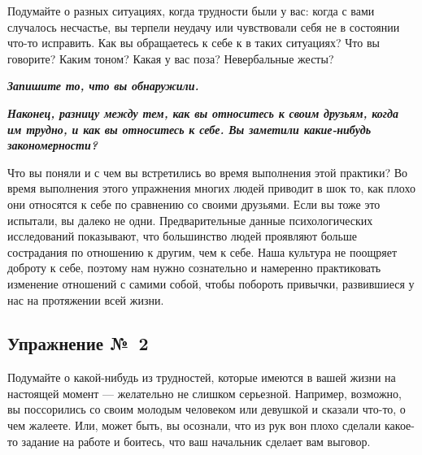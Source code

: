 Подумайте о разных ситуациях, когда трудности были у вас: когда с вами случалось несчастье, вы терпели неудачу или чувствовали себя не в состоянии что-то исправить. Как вы обращаетесь к себе к в таких ситуациях? Что вы говорите? Каким тоном? Какая у вас поза? Невербальные жесты?

\vspace{2ex}

\textbf{\textit{Запишите то, что вы обнаружили.}}

\vfill

\textbf{\textit{Наконец, разницу между тем, как вы относитесь к своим друзьям, когда им трудно, и как вы относитесь к себе. Вы заметили какие-нибудь закономерности?}}

\vfill


\newpage



\vspace{3ex}

Что вы поняли и с чем вы встретились во время выполнения этой практики?
Во время выполнения этого упражнения многих людей приводит в шок то, как плохо они относятся к себе по сравнению со своими друзьями. Если вы тоже это испытали, вы далеко не одни. Предварительные данные психологических исследований показывают, что большинство людей проявляют больше сострадания по отношению к другим, чем к себе. Наша культура не поощряет доброту к себе, поэтому нам нужно сознательно и намеренно практиковать изменение отношений с самими собой, чтобы побороть привычки, развившиеся у нас на протяжении всей жизни.


\newpage


\subsection{Упражнение №~2}


\vspace{3ex}

Подумайте о какой-нибудь из трудностей, которые имеются в вашей жизни на настоящей момент --- желательно не слишком серьезной. Например, возможно, вы поссорились со своим молодым человеком или девушкой и сказали что-то, о чем жалеете. Или, может быть, вы осознали, что из рук вон плохо сделали какое-то задание на работе и боитесь, что ваш начальник сделает вам выговор.

